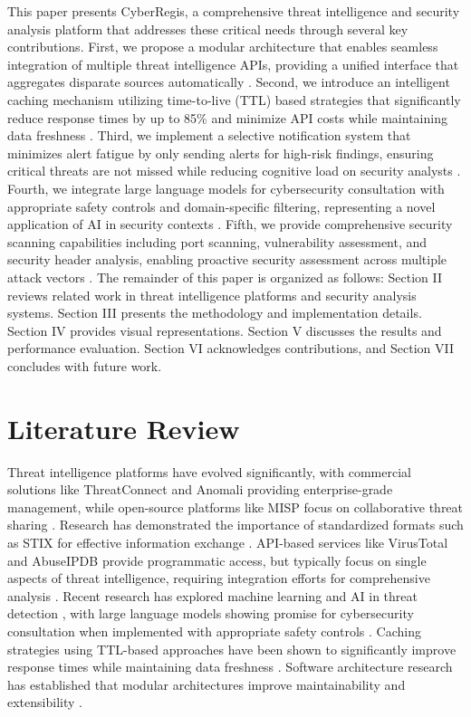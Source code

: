 \documentclass[pdflatex,sn-mathphys-num]{sn-jnl}%
\theoremstyle{thmstyleone}%
\theoremstyle{thmstyletwo}%
\theoremstyle{thmstylethree}%
\begin{document}
This paper presents CyberRegis, a comprehensive threat intelligence and security analysis platform that addresses these critical needs through several key contributions. First, we propose a modular architecture that enables seamless integration of multiple threat intelligence APIs, providing a unified interface that aggregates disparate sources automatically \cite{bib20}. Second, we introduce an intelligent caching mechanism utilizing time-to-live (TTL) based strategies that significantly reduce response times by up to 85\% and minimize API costs while maintaining data freshness \cite{bib18,bib19}. Third, we implement a selective notification system that minimizes alert fatigue by only sending alerts for high-risk findings, ensuring critical threats are not missed while reducing cognitive load on security analysts \cite{bib2,bib13}. Fourth, we integrate large language models for cybersecurity consultation with appropriate safety controls and domain-specific filtering, representing a novel application of AI in security contexts \cite{bib15,bib16}. Fifth, we provide comprehensive security scanning capabilities including port scanning, vulnerability assessment, and security header analysis, enabling proactive security assessment across multiple attack vectors \cite{bib5,bib9}. The remainder of this paper is organized as follows: Section II reviews related work in threat intelligence platforms and security analysis systems. Section III presents the methodology and implementation details. Section IV provides visual representations. Section V discusses the results and performance evaluation. Section VI acknowledges contributions, and Section VII concludes with future work. 

\section{Literature Review}\label{sec2}

Threat intelligence platforms have evolved significantly, with commercial solutions like ThreatConnect and Anomali providing enterprise-grade management, while open-source platforms like MISP focus on collaborative threat sharing \cite{bib10,bib11}. Research has demonstrated the importance of standardized formats such as STIX for effective information exchange \cite{bib4}. API-based services like VirusTotal and AbuseIPDB provide programmatic access, but typically focus on single aspects of threat intelligence, requiring integration efforts for comprehensive analysis \cite{bib12}. Recent research has explored machine learning and AI in threat detection \cite{bib13,bib14}, with large language models showing promise for cybersecurity consultation when implemented with appropriate safety controls \cite{bib15,bib16}. Caching strategies using TTL-based approaches have been shown to significantly improve response times while maintaining data freshness \cite{bib17,bib18,bib19}. Software architecture research has established that modular architectures improve maintainability and extensibility \cite{bib20}.
\end{document}
